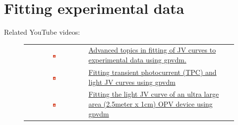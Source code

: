 \newpage
\section{Fitting experimental data}
\label{sec:fitting}

Related YouTube videos:
\begin{figure}[H]

\begin{tabular}{ c l }

\includegraphics[width=0.05\textwidth]{./images/youtube.png}

&
\href{https://www.youtube.com/watch?v=uEj0dB-mPTQ}{Advanced topics in fitting of JV curves to experimental data using gpvdm.}\
\\
\includegraphics[width=0.05\textwidth]{./images/youtube.png}

&
\href{https://www.youtube.com/watch?v=WY_grICDP4Y}{Fitting transient photocurrent (TPC) and light JV curves using gpvdm}
\\
\includegraphics[width=0.05\textwidth]{./images/youtube.png}

&
\href{https://www.youtube.com/watch?v=61umU4hrsqk&t=58s}{Fitting the light JV curve of an ultra large area (2.5meter x 1cm) OPV device using gpvdm}

\end{tabular}
\end{figure}

